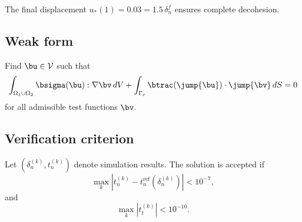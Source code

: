 The final displacement $u_*(1) = 0.03 = 1.5\,\delta_n^f$ ensures complete decohesion.

\subsection{Weak form}

Find $\bu \in \mathcal{V}$ such that
\begin{equation}
\int_{\Omega_1 \cup \Omega_2}
\bsigma(\bu) : \nabla \bv \, dV
+
\int_{\Gamma_c}
\btrac(\jump{\bu}) \cdot \jump{\bv} \, dS
= 0
\end{equation}
for all admissible test functions $\bv$.

\subsection{Verification criterion}

Let $(\delta_n^{(k)}, t_n^{(k)})$ denote simulation results. The solution is accepted if
\begin{equation}
\max_k \left| t_n^{(k)} - t_n^{\text{ref}}(\delta_n^{(k)}) \right| < 10^{-7},
\end{equation}
and
\begin{equation}
\max_k |t_t^{(k)}| < 10^{-10}.
\end{equation}


